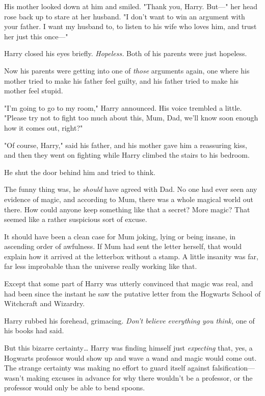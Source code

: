 His mother looked down at him and smiled. "Thank you, Harry. But---" her head 
rose back up to stare at her husband. "I don't want to win an argument with 
your father. I want my husband to, to listen to his wife who loves him, and 
trust her just this once---"

Harry closed his eyes briefly. \emph{Hopeless.} Both of his parents were just 
hopeless.

Now his parents were getting into one of \emph{those} arguments again, one 
where his mother tried to make his father feel guilty, and his father tried to 
make his mother feel stupid.

"I'm going to go to my room," Harry announced. His voice trembled a little. 
"Please try not to fight too much about this, Mum, Dad, we'll know soon enough 
how it comes out, right?"

"Of course, Harry," said his father, and his mother gave him a reassuring kiss, 
and then they went on fighting while Harry climbed the stairs to his bedroom.

He shut the door behind him and tried to think.

The funny thing was, he \emph{should} have agreed with Dad. No one had ever 
seen any evidence of magic, and according to Mum, there was a whole magical 
world out there. How could anyone keep something like that a secret? More 
magic? That seemed like a rather suspicious sort of excuse.

It should have been a clean case for Mum joking, lying or being insane, in 
ascending order of awfulness. If Mum had sent the letter herself, that would 
explain how it arrived at the letterbox without a stamp. A little insanity was 
far, far less improbable than the universe really working like that.

Except that some part of Harry was utterly convinced that magic was real, and 
had been since the instant he saw the putative letter from the Hogwarts School 
of Witchcraft and Wizardry.

Harry rubbed his forehead, grimacing. \emph{Don't believe everything you 
think,} one of his books had said.

But this bizarre certainty{\ldots} Harry was finding himself just 
\emph{expecting} that, yes, a Hogwarts professor would show up and wave a wand 
and magic would come out. The strange certainty was making no effort to guard 
itself against falsification---wasn't making excuses in advance for why there 
wouldn't be a professor, or the professor would only be able to bend spoons.

